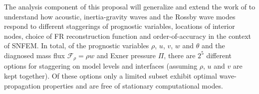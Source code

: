 \documentclass[11pt]{article}
\begin{document}
The analysis component of this proposal will generalize and extend the work of \cite{JTTJW2005JCP} to understand how acoustic, inertia-gravity waves and the Rossby wave modes respond to different staggerings of prognostic variables, locations of interior nodes, choice of FR reconstruction function and order-of-accuracy in the context of SNFEM.  In total, of the prognostic variables $\rho$, $u$, $v$, $w$ and $\theta$ and the diagnosed mass flux $\mathcal{F}_\rho = \rho w$ and Exner pressure $\Pi$, there are $2^5$ different options for staggering on model levels and interfaces (assuming $\rho$, $u$ and $v$ are kept together).  Of these options only a limited subset exhibit optimal wave-propagation properties and are free of stationary computational modes.


\end{document}
